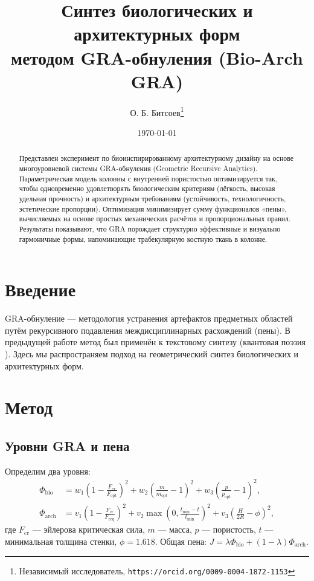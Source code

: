 \documentclass{article}
\title{Синтез биологических и архитектурных форм\\ методом GRA-обнуления (Bio-Arch GRA)}
\author{О. Б. Битсоев\thanks{Независимый исследователь, \texttt{https://orcid.org/0009-0004-1872-1153}}}
\date{\today}
\begin{document}
\maketitle

\begin{abstract}
Представлен эксперимент по биоинспирированному архитектурному дизайну на основе многоуровневой системы GRA-обнуления (Geometric Recursive Analytics). Параметрическая модель колонны с внутренней пористостью оптимизируется так, чтобы одновременно удовлетворять биологическим критериям (лёгкость, высокая удельная прочность) и архитектурным требованиям (устойчивость, технологичность, эстетические пропорции). Оптимизация минимизирует сумму функционалов «пены», вычисляемых на основе простых механических расчётов и пропорциональных правил. Результаты показывают, что GRA порождает структурно эффективные и визуально гармоничные формы, напоминающие трабекулярную костную ткань в колонне.
\end{abstract}

\section{Введение}
GRA-обнуление \cite{gra_metatheorem} — методология устранения артефактов предметных областей путём рекурсивного подавления междисциплинарных расхождений (пены). В предыдущей работе метод был применён к текстовому синтезу (квантовая поэзия \cite{gra_quantum_poetry}). Здесь мы распространяем подход на геометрический синтез биологических и архитектурных форм.

\section{Метод}
\subsection{Уровни GRA и пена}
Определим два уровня:
\begin{align}
\Phi_{\text{bio}} &= w_1 \left(1 - \frac{F_{\text{cr}}}{F_{\text{opt}}}\right)^{\!2}
                  + w_2 \left(\frac{m}{m_{\text{opt}}}-1\right)^{\!2}
                  + w_3 \left(\frac{p}{p_{\text{opt}}}-1\right)^{\!2}, \\
\Phi_{\text{arch}} &= v_1 \left(1 - \frac{F_{\text{cr}}}{F_{\text{req}}}\right)^{\!2}
                   + v_2 \max\!\left(0,\frac{t_{\text{min}}-t}{t_{\text{min}}}\right)^{\!2}
                   + v_3 \left(\frac{H}{2R} - \phi\right)^{\!2},
\end{align}
где $F_{\text{cr}}$ — эйлерова критическая сила, $m$ — масса, $p$ — пористость, $t$ — минимальная толщина стенки, $\phi = 1.618$. Общая пена:
$J = \lambda \Phi_{\text{bio}} + (1-\lambda)\Phi_{\text{arch}}$.
\end{document}
